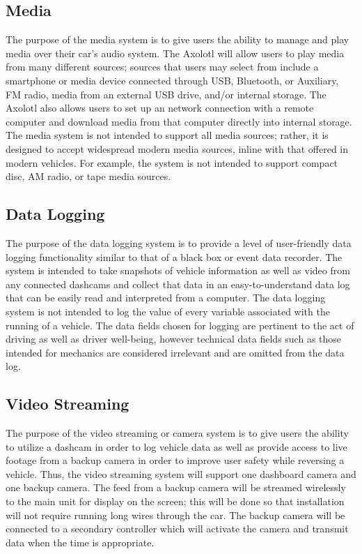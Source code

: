 \documentclass[onecolumn, draftclsnofoot,10pt, compsoc]{IEEEtran}
\begin{document}
\subsection{Media}
The purpose of the media system is to give users the ability to manage and play media over their car's audio system. The Axolotl will allow users to play media from many different sources; sources that users may select from include a smartphone or media device connected through USB, Bluetooth, or Auxiliary, FM radio, media from an external USB drive, and/or internal storage. The Axolotl also allows users to set up an network connection with a remote computer and download media from that computer directly into internal storage.
The media system is not intended to support all media sources; rather, it is designed to accept widespread modern media sources, inline with that offered in modern vehicles. For example, the system is not intended to support compact disc, AM radio, or tape media sources.

\subsection{Data Logging}
The purpose of the data logging system is to provide a level of user-friendly data logging functionality similar to that of a black box or event data recorder. The system is intended to take snapshots of vehicle information as well as video from any connected dashcams and collect that data in an easy-to-understand data log that can be easily read and interpreted from a computer. The data logging system is not intended to log the value of every variable associated with the running of a vehicle. The data fields chosen for logging are pertinent to the act of driving as well as driver well-being, however technical data fields such as those intended for mechanics are considered irrelevant and are omitted from the data log.

\subsection{Video Streaming}
The purpose of the video streaming or camera system is to give users the ability to utilize a dashcam in order to log vehicle data as well as provide access to live footage from a backup camera in order to improve user safety while reversing a vehicle. Thus, the video streaming system will support one dashboard camera and one backup camera. The feed from a backup camera will be streamed wirelessly to the main unit for display on the screen; this will be done so that installation will not require running long wires through the car. The backup camera will be connected to a secondary controller which will activate the camera and transmit data when the time is appropriate.
\end{document}
